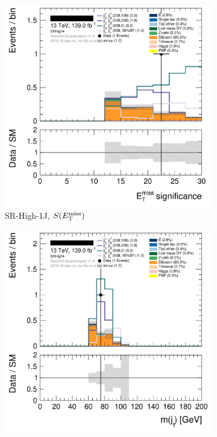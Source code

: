 \begin{figure}[tp]
\centering
\begin{subfigure}{0.48\textwidth}
\centering
\includegraphics[width=\textwidth]{figures/2ljets_def_met_Sign_SRHigh4.png}
\caption{SR-High-1J, $S(E_\mathrm{T}^\mathrm{miss})$}
\end{subfigure}
\hfill
\begin{subfigure}{0.48\textwidth}
\centering
\includegraphics[width=\textwidth]{figures/2ljets_def_mjetone_SRHigh4.png}

\end{subfigure}
\end{figure}
